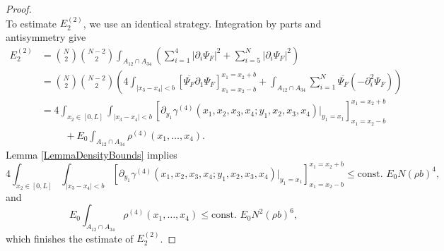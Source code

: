\documentclass[a4paper,11pt]{article}
\newcommand{\abs}[1]{\left\lvert #1 \right\rvert}
\numberwithin{equation}{section}
\begin{document}
\begin{proof}
\begin{equation}
		\end{equation}
		To estimate $ E_2^{(2)} $, we use an identical strategy. Integration by parts and antisymmetry give  \begin{equation}
		\begin{aligned}
		E_2^{(2)}&=\binom{N}{2}\binom{N-2}{2}\int_{A_{12}\cap A_{34}} \left(\sum_{i=1}^{4}\abs{\partial_i\Psi_F}^2+\sum_{i=5}^{N}\abs{\partial_i\Psi_F}^2\right)\\
		&=\binom{N}{2}\binom{N-2}{2}\left(4\int_{\abs{x_3-x_4}<b}\left[\overline{\Psi_F}\partial_1\Psi_F\right]_{x_1=x_2-b}^{x_1=x_2+b} +\int_{A_{12}\cap A_{34}} \sum_{i=1}^{N}\overline{\Psi_F}(-\partial^2_i\Psi_F)\right)\\
		&=4\int_{x_2\in[0,L]}\int_{\abs{x_3-x_4}<b}\left[\partial_{y_1}\gamma^{(4)}(x_1,x_2,x_3,x_4;y_1,x_2,x_3,x_4)\bigg\vert_{y_1=x_1}\right]_{x_1=x_2-b}^{x_1=x_2+b}\\&\hspace{1cm}+E_0\int_{A_{12}\cap A_{34}}\rho^{(4)}(x_1,\dots,x_4).
		\end{aligned}
		\end{equation}
		Lemma \ref{LemmaDensityBounds} implies \begin{equation}
		4\int_{x_2\in[0,L]}\int_{\abs{x_3-x_4}<b}\left[\partial_{y_1}\gamma^{(4)}(x_1,x_2,x_3,x_4;y_1,x_2,x_3,x_4)\bigg\vert_{y_1=x_1}\right]_{x_1=x_2-b}^{x_1=x_2+b}\leq\text{const. }E_0 N (\rho b)^4,
		\end{equation}
		and\begin{equation}
		E_0\int_{A_{12}\cap A_{34}}\rho^{(4)}(x_1,\dots,x_4)\leq \text{const. } E_0 N^2(\rho b)^6,
		\end{equation}
  which finishes the estimate of $E^{(2)}_2$.
	\end{proof}
	
\end{document}
